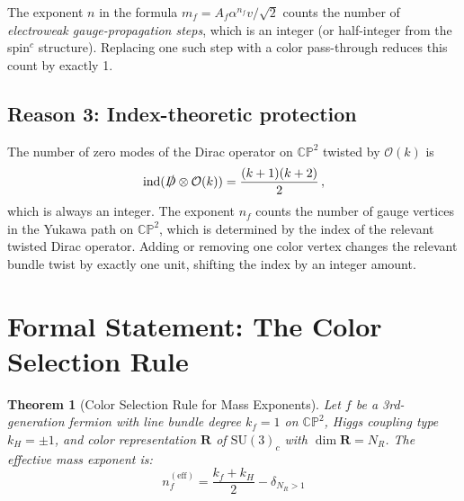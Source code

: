 \documentclass[11pt,a4paper]{article}
\newcommand{\CP}{\mathbb{CP}}
\newcommand{\ind}{\mathrm{ind}}
\newtheorem{theorem}{Theorem}[section]
\theoremstyle{definition}
\theoremstyle{remark}
\begin{document}
The exponent $n$ in the formula $m_f = A_f \alpha^{n_f} v/\sqrt{2}$
counts the number of \emph{electroweak gauge-propagation steps}, which
is an integer (or half-integer from the spin$^c$ structure).  Replacing
one such step with a color pass-through reduces this count by exactly 1.

\subsection{Reason 3: Index-theoretic protection}

The number of zero modes of the Dirac operator on $\CP^2$ twisted by
$\mathcal{O}(k)$ is
\begin{equation}
\ind(\slashed{D} \otimes \mathcal{O}(k))
= \frac{(k+1)(k+2)}{2}\,,
\end{equation}
which is always an integer.  The exponent $n_f$ counts the number of
gauge vertices in the Yukawa path on $\CP^2$, which is determined by
the index of the relevant twisted Dirac operator.  Adding or removing
one color vertex changes the relevant bundle twist by exactly one unit,
shifting the index by an integer amount.

\section{Formal Statement: The Color Selection Rule}
\label{sec:formal}

\begin{theorem}[Color Selection Rule for Mass Exponents]
\label{thm:color-rule}
Let $f$ be a 3rd-generation fermion with line bundle degree $k_f = 1$
on $\CP^2$, Higgs coupling type $k_H = \pm 1$, and color
representation $\mathbf{R}$ of $\mathrm{SU}(3)_c$ with
$\dim \mathbf{R} = N_R$.  The effective mass exponent is:
\begin{equation}\label{eq:master-rule}
\boxed{n_f^{(\mathrm{eff})} = \frac{k_f + k_H}{2}
- \delta_{N_R > 1}}
\end{equation}
\end{theorem}
\end{document}
